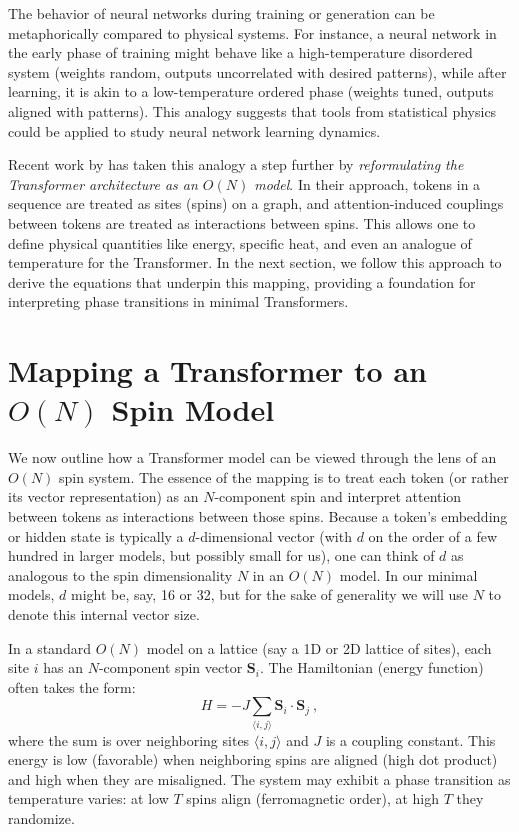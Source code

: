 \documentclass[12pt]{article}
\begin{document}
The behavior of neural networks during training or generation can be metaphorically compared to physical systems. For instance, a neural network in the early phase of training might behave like a high-temperature disordered system (weights random, outputs uncorrelated with desired patterns), while after learning, it is akin to a low-temperature ordered phase (weights tuned, outputs aligned with patterns). This analogy suggests that tools from statistical physics could be applied to study neural network learning dynamics.

Recent work by \citet{sun2025} has taken this analogy a step further by \emph{reformulating the Transformer architecture as an $O(N)$ model}. In their approach, tokens in a sequence are treated as sites (spins) on a graph, and attention-induced couplings between tokens are treated as interactions between spins. This allows one to define physical quantities like energy, specific heat, and even an analogue of temperature for the Transformer. In the next section, we follow this approach to derive the equations that underpin this mapping, providing a foundation for interpreting phase transitions in minimal Transformers.

\section{Mapping a Transformer to an $O(N)$ Spin Model}
\label{sec:mapping}
We now outline how a Transformer model can be viewed through the lens of an $O(N)$ spin system. The essence of the mapping is to treat each token (or rather its vector representation) as an $N$-component spin and interpret attention between tokens as interactions between those spins. Because a token's embedding or hidden state is typically a $d$-dimensional vector (with $d$ on the order of a few hundred in larger models, but possibly small for us), one can think of $d$ as analogous to the spin dimensionality $N$ in an $O(N)$ model. In our minimal models, $d$ might be, say, 16 or 32, but for the sake of generality we will use $N$ to denote this internal vector size.

In a standard $O(N)$ model on a lattice (say a 1D or 2D lattice of sites), each site $i$ has an $N$-component spin vector $\mathbf{S}_i$. The Hamiltonian (energy function) often takes the form:
\[ H = -J \sum_{\langle i,j \rangle} \mathbf{S}_i \cdot \mathbf{S}_j~, \] 
where the sum is over neighboring sites $\langle i,j\rangle$ and $J$ is a coupling constant. This energy is low (favorable) when neighboring spins are aligned (high dot product) and high when they are misaligned. The system may exhibit a phase transition as temperature varies: at low $T$ spins align (ferromagnetic order), at high $T$ they randomize.
\end{document}
